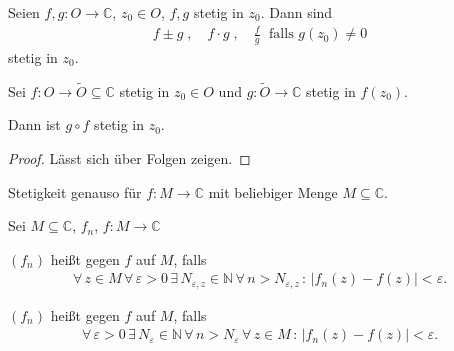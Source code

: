 \begin{theorem}[Satz]
  \begin{enum-arab}
    \item Seien $f,g : O \to \mathbb{C}$, $z_0 \in O$, $f,g$ stetig in $z_0$. Dann sind
    \begin{align*}
      f \pm g \; , \quad f \cdot g \; , \quad \frac{f}{g} \; \text{ falls $g(z_0) \neq 0$}
    \end{align*}
    stetig in $z_0$.
    
    \item Sei $f : O \to \widetilde{O} \subseteq \mathbb{C}$ stetig in $z_0 \in O$ und $g : \widetilde{O} \to \mathbb{C}$ stetig in $f(z_0)$.

    Dann ist $g \circ f$ stetig in $z_0$. 
    \begin{proof}
      Lässt sich über Folgen zeigen.
    \end{proof}
  \end{enum-arab}
\end{theorem}

\begin{notice}
  Stetigkeit genauso für $f: M \to \mathbb{C}$ mit beliebiger Menge $M \subseteq \mathbb{C}$.
\end{notice}

\begin{theorem}[Funktionenfolgen]
  Sei $M \subseteq \mathbb{C}$, $f_n$, $f : M \to \mathbb{C}$
  \begin{enum-arab}
    \item $(f_n)$ heißt  gegen $f$ auf $M$, falls
    \begin{align*}
      \forall \, z \in M \, \forall \, \varepsilon > 0 \, \exists \, N_{\varepsilon,z} \in \mathbb{N} \, \forall \, n > N_{\varepsilon,z} \, : \, |f_n(z) - f(z)| < \varepsilon.
    \end{align*}
    \item $(f_n)$ heißt  gegen $f$ auf $M$, falls
    \begin{align*}
      \forall \, \varepsilon > 0 \, \exists \, N_{\varepsilon} \in \mathbb{N} \, \forall \, n > N_{\varepsilon} \, \forall \, z \in M \, : \, |f_n(z) - f(z)| < \varepsilon.
    \end{align*}
  \end{enum-arab}
\end{theorem}

